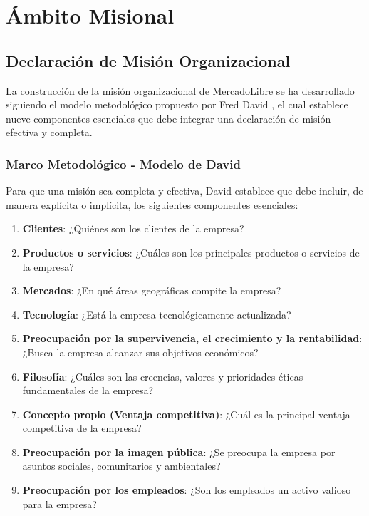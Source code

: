 \section{Ámbito Misional}
\label{sec:ambito_misional}

\subsection{Declaración de Misión Organizacional}

La construcción de la misión organizacional de MercadoLibre se ha desarrollado siguiendo el modelo metodológico propuesto por Fred David \autocite{david2017}, el cual establece nueve componentes esenciales que debe integrar una declaración de misión efectiva y completa.

\subsubsection{Marco Metodológico - Modelo de David}

Para que una misión sea completa y efectiva, David establece que debe incluir, de manera explícita o implícita, los siguientes componentes esenciales:

\begin{enumerate}
\item \textbf{Clientes}: ¿Quiénes son los clientes de la empresa?
\item \textbf{Productos o servicios}: ¿Cuáles son los principales productos o servicios de la empresa?
\item \textbf{Mercados}: ¿En qué áreas geográficas compite la empresa?
\item \textbf{Tecnología}: ¿Está la empresa tecnológicamente actualizada?
\item \textbf{Preocupación por la supervivencia, el crecimiento y la rentabilidad}: ¿Busca la empresa alcanzar sus objetivos económicos?
\item \textbf{Filosofía}: ¿Cuáles son las creencias, valores y prioridades éticas fundamentales de la empresa?
\item \textbf{Concepto propio (Ventaja competitiva)}: ¿Cuál es la principal ventaja competitiva de la empresa?
\item \textbf{Preocupación por la imagen pública}: ¿Se preocupa la empresa por asuntos sociales, comunitarios y ambientales?
\item \textbf{Preocupación por los empleados}: ¿Son los empleados un activo valioso para la empresa?
\end{enumerate}

